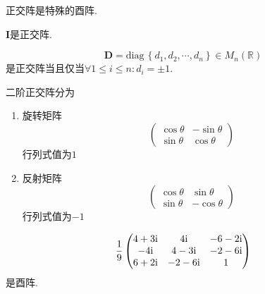 \begin{red}
    \begin{remark}
        正交阵是特殊的酉阵.
    \end{remark}
\end{red}
\begin{brown}
    \begin{example}
        $\bm{I}$是正交阵.
    \end{example}
\end{brown}
\begin{brown}
    \begin{example}
        \[
        \bm{D}=\mathrm{diag}\,\left\{
            d_1,d_2,\cdots,d_n
        \right\}\in M_n\left(\mathbb{R}\right)
        \]是正交阵当且仅当$\forall1\leqslant i\leqslant n:d_i=\pm1.$
    \end{example}
\end{brown}
\begin{brown}
    \begin{example}
        二阶正交阵分为\begin{enumerate}[label={\textup{(\arabic*)}}]
            \item 旋转矩阵\[
            \begin{pmatrix}
                \cos\theta&-\sin\theta\\
                \sin\theta&\cos\theta  
            \end{pmatrix}
            \]行列式值为$1$
            \item 反射矩阵\[
            \begin{pmatrix}
                \cos\theta&\sin\theta\\
                \sin\theta&-\cos\theta  
            \end{pmatrix}
            \]行列式值为$-1$
        \end{enumerate}
    \end{example}
\end{brown}
\begin{brown}
    \begin{example}
        \[
        \frac{1}{9}\begin{pmatrix}
            4+3\mathrm{i}&4\mathrm{i}&-6-2\mathrm{i}\\
            -4\mathrm{i}&4-3\mathrm{i}&-2-6\mathrm{i}\\
            6+2\mathrm{i}&-2-6\mathrm{i}&1
        \end{pmatrix}
        \]是酉阵.
    \end{example}
\end{brown}
